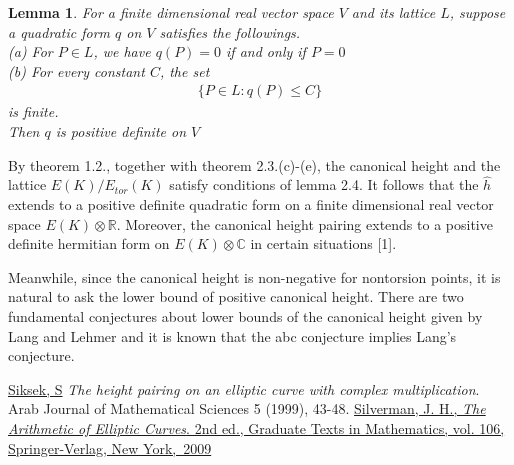\documentclass[11pt]{article}
\newcommand{\<}{\langle}
\renewcommand{\>}{\rangle}
\numberwithin{equation}{section}
\theoremstyle{plain}
\newtheorem{lemma}[thm]{Lemma}
\theoremstyle{definition}
\begin{document}
    \begin{lemma} For a finite dimensional real vector space \(V\) and its lattice \(L\), suppose a quadratic form \(q\) on \(V\) satisfies the followings. \\
    (a) For \(P \in L\), we have \(q(P) = 0 \) if and only if \( P = 0 \) \\
    (b) For every constant \(C\), the set 
        \begin{align*}
            \{P \in L : q(P) \le C \}
        \end{align*}
       \quad is finite. \\
    Then \(q\) is positive definite on \(V\)
    \end{lemma}
    
    By theorem 1.2., together with theorem 2.3.(c)-(e), the canonical height and the lattice \(E(K)/E_{tor}(K)\) satisfy conditions of lemma 2.4. It follows that the \(\hat{h}\) extends to a positive definite quadratic form on a finite dimensional real vector space \(E(K) \otimes \mathbb{R} \). Moreover, the canonical height pairing extends to a positive definite hermitian form on \(E(K) \otimes \mathbb{C}\) in certain situations [1]. 
    
    Meanwhile, since the canonical height is non-negative for nontorsion points, it is natural to ask the lower bound of positive canonical height. There are two fundamental conjectures about lower bounds of the canonical height given by Lang and Lehmer and it is known that the abc conjecture implies Lang's conjecture.
\begin{thebibliography}{}

\bibitem{}
 \href{http://homepages.warwick.ac.uk/staff/S.Siksek/papers/compheight3.pdf}{Siksek, S}
 \emph{The height pairing on an elliptic curve with complex multiplication}. Arab Journal of Mathematical Sciences 5 (1999), 43-48.
\bibitem{}
 \href{https://www.springer.com/la/book/9780387094939}{Silverman, J. H.,
 \emph{The Arithmetic of Elliptic Curves}. 2nd ed.,
 Graduate Texts in Mathematics, vol. 106, Springer-Verlag, New York,~2009}
 
\end{thebibliography}
\end{document}
